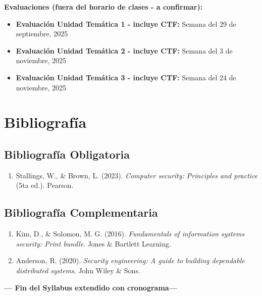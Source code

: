\documentclass[12pt,a4paper]{article}
\begin{document}
\textbf{Evaluaciones (fuera del horario de clases - a confirmar):}
\begin{itemize}
\item \textbf{Evaluación Unidad Temática 1 - incluye CTF:} Semana del 29 de septiembre, 2025
\item \textbf{Evaluación Unidad Temática 2 - incluye CTF:} Semana del 3 de noviembre, 2025  
\item \textbf{Evaluación Unidad Temática 3 - incluye CTF:} Semana del 24 de noviembre, 2025
\end{itemize}





\section*{Bibliografía}

\subsection*{Bibliografía Obligatoria}
\begin{enumerate}

    \item Stallings, W., \& Brown, L. (2023). \textit{Computer security: Principles and practice} (5ta ed.). Pearson. 
\end{enumerate}

\subsection*{Bibliografía Complementaria}
\begin{enumerate}

    \item Kim, D., \& Solomon, M. G. (2016). \textit{Fundamentals of information systems security: Print bundle}. Jones \& Bartlett Learning.

\item Anderson, R. (2020). \textit{Security engineering: A guide to building dependable distributed systems}. John Wiley \& Sons.
\end{enumerate}
\begin{center}
    \textbf{--- Fin del Syllabus extendido con cronograma---}
    \end{center}
    
\end{document}
